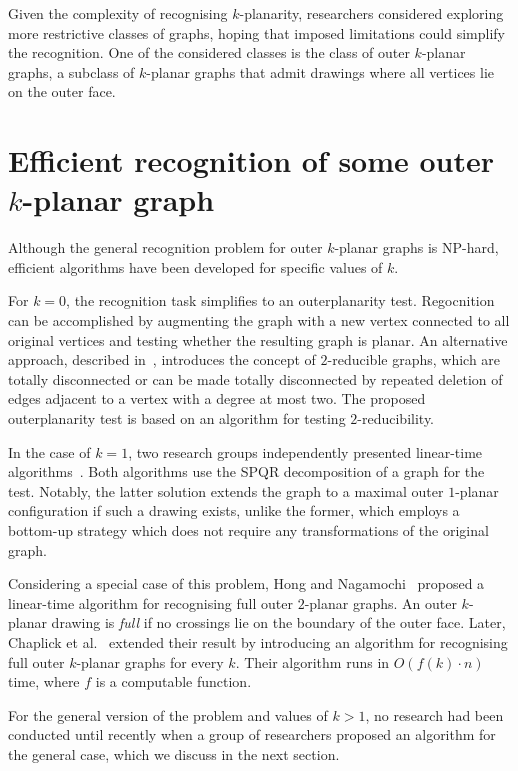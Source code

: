 Given the complexity of recognising \(k\)-planarity, researchers considered exploring more restrictive classes of graphs, hoping that imposed limitations could simplify the recognition. One of the considered classes is the class of outer \(k\)-planar graphs, a subclass of \(k\)-planar graphs that admit drawings where all vertices lie on the outer face.


\section{Efficient recognition of some outer \(k\)-planar graph}

Although the general recognition problem for outer \(k\)-planar graphs is NP-hard, efficient algorithms have been developed for specific values of \(k\).

For \(k = 0\), the recognition task simplifies to an outerplanarity test. Regocnition can be accomplished by augmenting the graph with a new vertex connected to all original vertices and testing whether the resulting graph is planar. An alternative approach, described in~\cite{linear-op}, introduces the concept of \(2\)-reducible graphs, which are totally disconnected or can be made totally disconnected by repeated deletion of edges adjacent to a vertex with a degree at most two. The proposed outerplanarity test is based on an algorithm for testing \(2\)-reducibility.

In the case of \(k = 1\), two research groups independently presented linear-time algorithms~\cite{linear-o1p_, linear-o1p}. Both algorithms use the SPQR decomposition of a graph for the test. Notably, the latter solution extends the graph to a maximal outer \(1\)-planar configuration if such a drawing exists, unlike the former, which employs a bottom-up strategy which does not require any transformations of the original graph.

Considering a special case of this problem, Hong and Nagamochi~\cite{linear-full-o2p} proposed a linear-time algorithm for recognising full outer \(2\)-planar graphs. An outer \(k\)-planar drawing is \emph{full} if no crossings lie on the boundary of the outer face. Later, Chaplick et al.~\cite{linear-full-okp} extended their result by introducing an algorithm for recognising full outer \(k\)-planar graphs for every \(k\). Their algorithm runs in \(O(f(k) \cdot n)\) time, where \(f\) is a computable function.

For the general version of the problem and values of \(k > 1\), no research had been conducted until recently when a group of researchers proposed an algorithm for the general case, which we discuss in the next section.


